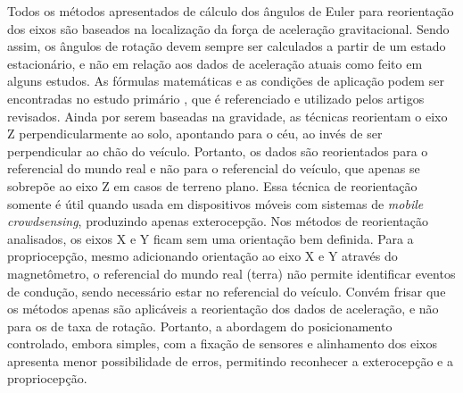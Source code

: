 Todos os métodos apresentados de cálculo dos ângulos de Euler para reorientação dos eixos são baseados na localização da força de aceleração gravitacional. Sendo assim, os ângulos de rotação devem sempre ser calculados a partir de um estado estacionário, e não em relação aos dados de aceleração atuais como feito em alguns estudos. As fórmulas matemáticas e as condições de aplicação podem ser encontradas no estudo primário , que é referenciado e utilizado pelos artigos revisados. Ainda por serem baseadas na gravidade, as técnicas reorientam o eixo Z perpendicularmente ao solo, apontando para o céu, ao invés de ser perpendicular ao chão do veículo. Portanto, os dados são reorientados para o referencial do mundo real e não para o referencial do veículo, que apenas se sobrepõe ao eixo Z em casos de terreno plano. Essa técnica de reorientação somente é útil quando usada em dispositivos móveis com sistemas de \textit{mobile crowdsensing}, produzindo apenas exterocepção. Nos métodos de reorientação analisados, os eixos X e Y ficam sem uma orientação bem definida. Para a propriocepção, mesmo adicionando orientação ao eixo X e Y através do magnetômetro, o referencial do mundo real (terra) não permite identificar eventos de condução, sendo necessário estar no referencial do veículo. Convém frisar que os métodos apenas são aplicáveis a reorientação dos dados de aceleração, e não para os de taxa de rotação. Portanto, a abordagem do posicionamento controlado, embora simples, com a fixação de sensores e alinhamento dos eixos apresenta menor possibilidade de erros, permitindo reconhecer a exterocepção e a propriocepção.

